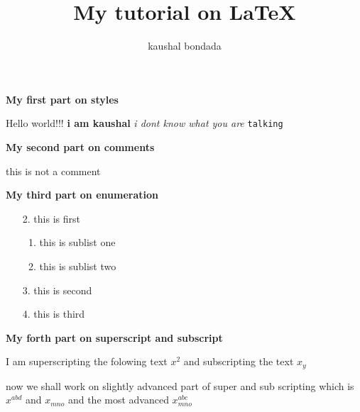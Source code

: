 \documentclass{article}
\begin{document}
    \title{My tutorial on \LaTeX{} }
    \author{kaushal bondada}
    \maketitle

    \noindent \textbf{My first part on styles}

    
    \noindent Hello world!!! \textbf{i am kaushal} \textit{i dont
    know what you are} \texttt{talking}

    \noindent \textbf{My second part on comments}


    \noindent this is not a comment

    \noindent \textbf{My third part on enumeration}


    \begin{enumerate}
        \item[2.]  this is first
            \begin{enumerate}
                \item this is sublist one
                \item this is sublist two
            \end{enumerate}
        \item[3.] this is second
        \item[4.] this is third
    \end{enumerate}
    
    \noindent \textbf{My forth part on superscript and subscript}

    \noindent I am superscripting the folowing text $x^2$ and subscripting
    the text $x_y$ 


    \noindent now we shall work on slightly advanced part of super
    and sub scripting which is $x^{abd}$ and $x_{mno}$ and the most
    advanced $x^{abc}_{mno}$
    
\end{document}
